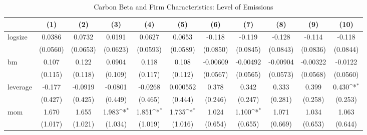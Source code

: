 \begin{table}[htbp]\centering
\def\sym#1{\ifmmode^{#1}\else\(^{#1}\)\fi}
\caption{Carbon Beta and Firm Characteristics: Level of Emissions}
\begin{tabular}{l*{10}{c}}
\hline\hline
                &\multicolumn{1}{c}{(1)}         &\multicolumn{1}{c}{(2)}         &\multicolumn{1}{c}{(3)}         &\multicolumn{1}{c}{(4)}         &\multicolumn{1}{c}{(5)}         &\multicolumn{1}{c}{(6)}         &\multicolumn{1}{c}{(7)}         &\multicolumn{1}{c}{(8)}         &\multicolumn{1}{c}{(9)}         &\multicolumn{1}{c}{(10)}         \\
\hline
logsize         &   0.0386         &   0.0732         &   0.0191         &   0.0627         &   0.0653         &   -0.118         &   -0.119         &   -0.128         &   -0.114         &   -0.118         \\
                & (0.0560)         & (0.0653)         & (0.0623)         & (0.0593)         & (0.0589)         & (0.0850)         & (0.0845)         & (0.0843)         & (0.0836)         & (0.0844)         \\
bm              &    0.107         &    0.122         &   0.0904         &    0.118         &    0.108         & -0.00609         & -0.00492         & -0.00904         & -0.00322         &  -0.0122         \\
                &  (0.115)         &  (0.118)         &  (0.109)         &  (0.117)         &  (0.112)         & (0.0567)         & (0.0565)         & (0.0573)         & (0.0568)         & (0.0560)         \\
leverage        &   -0.177         &  -0.0919         &  -0.0801         &  -0.0268         & 0.000552         &    0.378         &    0.342         &    0.333         &    0.399         &    0.430\sym{*}  \\
                &  (0.427)         &  (0.425)         &  (0.449)         &  (0.465)         &  (0.444)         &  (0.246)         &  (0.247)         &  (0.281)         &  (0.258)         &  (0.253)         \\
mom             &    1.670         &    1.655         &    1.983\sym{*}  &    1.851\sym{*}  &    1.735\sym{*}  &    1.024         &    1.100\sym{*}  &    1.071         &    1.034         &    1.063         \\
                &  (1.017)         &  (1.021)         &  (1.034)         &  (1.019)         &  (1.016)         &  (0.654)         &  (0.655)         &  (0.669)         &  (0.653)         &  (0.644)         \\

\end{tabular}
\end{table}
